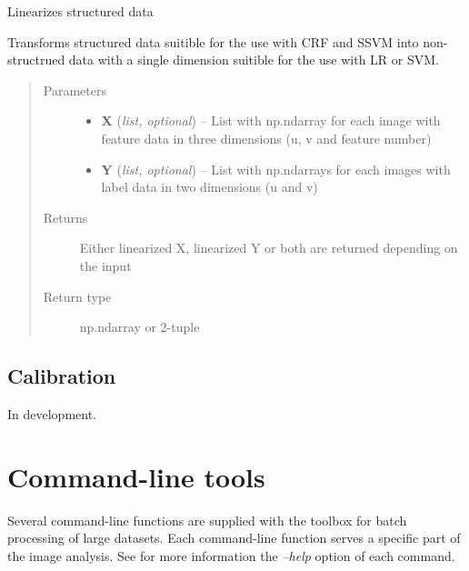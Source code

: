\documentclass[letterpaper,10pt,english]{sphinxmanual}
\begin{document}
\begin{fulllineitems}
\label{classification:flamingo.classification.utils.linearize_data}
Linearizes structured data

Transforms structured data suitible for the use with CRF and SSVM
into non-structrued data with a single dimension suitible for the
use with LR or SVM.
\begin{quote}\begin{description}
\item[{Parameters}] \leavevmode\begin{itemize}
\item {} 
\textbf{X} (\emph{list, optional}) -- List with np.ndarray for each image with feature data in three
dimensions (u, v and feature number)

\item {} 
\textbf{Y} (\emph{list, optional}) -- List with np.ndarrays for each images with label data in two
dimensions (u and v)

\end{itemize}

\item[{Returns}] \leavevmode
Either linearized X, linearized Y or both are returned
depending on the input

\item[{Return type}] \leavevmode
np.ndarray or 2-tuple

\end{description}\end{quote}

\end{fulllineitems}



\section{Calibration}
\label{calibration::doc}\label{calibration:calibration}
In development.


\chapter{Command-line tools}
\label{index:command-line-tools}
Several command-line functions are supplied with the toolbox for batch processing of large datasets.
Each command-line function serves a specific part of the image analysis.
See for more information the \emph{--help} option of each command.
\end{document}
